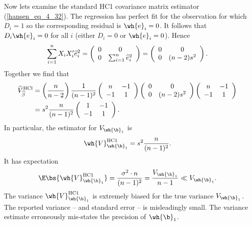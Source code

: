 Now lets examine the standard HC1 covariance matrix estimator (\ref{hansen_eq_4_32}). The regression has perfect fit for the observation for which $D_i = 1$ so the corresponding residual is $\wh{e}_i = 0$. It follows that $D_i \wh{e}_i = 0$ for all $i$ (either $D_i = 0$ or $\wh{e}_i = 0$). Hence 
\begin{equation}
    \notag 
    \sum_{i=1}^n X_i X_i^{\prime} \widehat{e}_i^2=\left(\begin{array}{cc}
    0 & 0 \\
    0 & \sum_{i=1}^n \widehat{e}_i^2
    \end{array}\right)=\left(\begin{array}{cc}
    0 & 0 \\
    0 & (n-2) s^2
    \end{array}\right).
\end{equation}
Together we find that 
\begin{equation}
    \notag 
    \begin{aligned}
    \widehat{V}_{\widehat{\beta}}^{\mathrm{HCl}} & =\left(\frac{n}{n-2}\right) \frac{1}{(n-1)^2}\left(\begin{array}{cc}
    n & -1 \\
    -1 & 1
    \end{array}\right)\left(\begin{array}{cc}
    0 & 0 \\
    0 & (n-2) s^2
    \end{array}\right)\left(\begin{array}{cc}
    n & -1 \\
    -1 & 1
    \end{array}\right) \\
    & =s^2 \frac{n}{(n-1)^2}\left(\begin{array}{cc}
    1 & -1 \\
    -1 & 1
    \end{array}\right) .
    \end{aligned}
\end{equation}
In particular, the estimator for $V_{\wh{\b}_1}$ is 
\begin{equation}
    \notag 
    \wh{V}_{\wh{\b}_1}^{\text{HC1}} = s^2 \frac{n}{(n-1)^2}.
\end{equation}
It has expectation 
\begin{equation}
    \notag 
    \E\bs{\wh{V}_{\wh{\b}_1}^{\text{HC1}}} = \frac{\sigma^2 \cdot n}{(n-1)^2} = \frac{V_{\wh{\b}_1}}{n-1} \ll V_{\wh{\b}_1}.
\end{equation}
The variance $\wh{V}_{\wh{\b}_1}^{\text{HC1}}$ is extremely biased for the true variance $V_{\wh{\b}_1}$. The reported
variance -- and standard error -- is misleadingly small. The variance estimate erroneously mis-states the precision of $\wh{\b}_1$.

